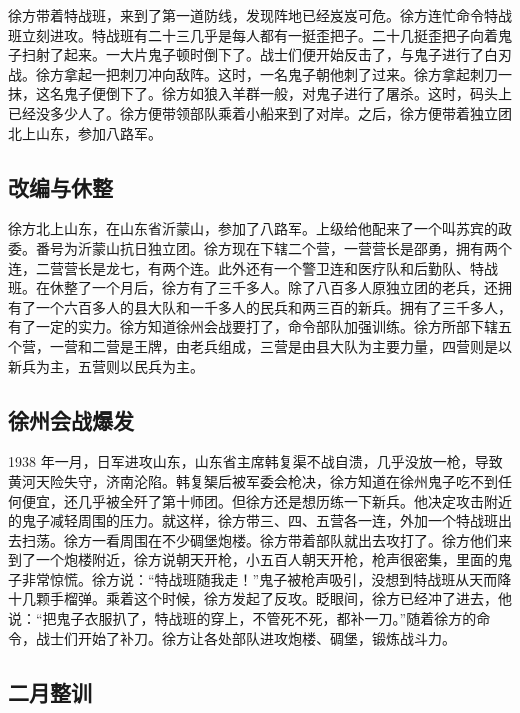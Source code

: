 \documentclass[UTF8,a4paper,titlepage,twoside,10.5pt]{article}
\begin{document}
徐方带着特战班，来到了第一道防线，发现阵地已经岌岌可危。徐方连忙命令特战班立刻进攻。特战班有二十三几乎是每人都有一挺歪把子。二十几挺歪把子向着鬼子扫射了起来。一大片鬼子顿时倒下了。战士们便开始反击了，与鬼子进行了白刃战。徐方拿起一把刺刀冲向敌阵。这时，一名鬼子朝他刺了过来。徐方拿起刺刀一抹，这名鬼子便倒下了。徐方如狼入羊群一般，对鬼子进行了屠杀。这时，码头上已经没多少人了。徐方便带领部队乘着小船来到了对岸。之后，徐方便带着独立团北上山东，参加八路军。

\subsection{改编与休整}
\label{sec:orgd5d39cd}

徐方北上山东，在山东省沂蒙山，参加了八路军。上级给他配来了一个叫苏宾的政委。番号为沂蒙山抗日独立团。徐方现在下辖二个营，一营营长是邵勇，拥有两个连，二营营长是龙七，有两个连。此外还有一个警卫连和医疗队和后勤队、特战班。在休整了一个月后，徐方有了三千多人。除了八百多人原独立团的老兵，还拥有了一个六百多人的县大队和一千多人的民兵和两三百的新兵。拥有了三千多人，有了一定的实力。徐方知道徐州会战要打了，命令部队加强训练。徐方所部下辖五个营，一营和二营是王牌，由老兵组成，三营是由县大队为主要力量，四营则是以新兵为主，五营则以民兵为主。

\subsection{徐州会战爆发}
\label{sec:org85ac6af}

1938 年一月，日军进攻山东，山东省主席韩复渠不战自溃，几乎没放一枪，导致黄河天险失守，济南沦陷。韩复榘后被军委会枪决，徐方知道在徐州鬼子吃不到任何便宜，还几乎被全歼了第十师团。但徐方还是想历练一下新兵。他决定攻击附近的鬼子减轻周围的压力。就这样，徐方带三、四、五营各一连，外加一个特战班出去扫荡。徐方一看周围在不少碉堡炮楼。徐方带着部队就出去攻打了。徐方他们来到了一个炮楼附近，徐方说朝天开枪，小五百人朝天开枪，枪声很密集，里面的鬼子非常惊慌。徐方说：“特战班随我走！”鬼子被枪声吸引，没想到特战班从天而降十几颗手榴弹。乘着这个时候，徐方发起了反攻。眨眼间，徐方已经冲了进去，他说：“把鬼子衣服扒了，特战班的穿上，不管死不死，都补一刀。”随着徐方的命令，战士们开始了补刀。徐方让各处部队进攻炮楼、碉堡，锻炼战斗力。

\subsection{二月整训}
\label{sec:org97d9811}
\end{document}
